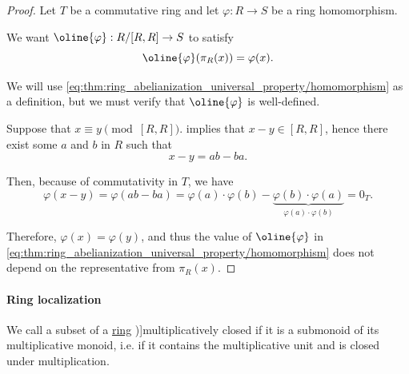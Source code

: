 \begin{proof}
  Let \( T \) be a commutative ring and let \( \varphi: R \to S \) be a ring homomorphism.

  We want \( \oline{\varphi}: R / [R, R] \to S \) to satisfy
  \begin{equation}\label{eq:thm:ring_abelianization_universal_property/homomorphism}
    \oline{\varphi}(\pi_R(x)) = \varphi(x).
  \end{equation}

  We will use \eqref{eq:thm:ring_abelianization_universal_property/homomorphism} as a definition, but we must verify that \( \oline{\varphi} \) is well-defined.

  Suppose that \( x \equiv y \pmod {[R, R]} \).  implies that \( x - y \in [R, R] \), hence there exist some \( a \) and \( b \) in \( R \) such that
  \begin{equation*}
    x - y = ab - ba.
  \end{equation*}

  Then, because of commutativity in \( T \), we have
  \begin{equation*}
    \varphi(x - y)
    =
    \varphi(ab - ba)
    =
    \varphi(a) \cdot \varphi(b) - \underbrace{\varphi(b) \cdot \varphi(a)}_{\varphi(a) \cdot \varphi(b)}
    =
    0_T.
  \end{equation*}

  Therefore, \( \varphi(x) = \varphi(y) \), and thus the value of \( \oline{\varphi} \) in \eqref{eq:thm:ring_abelianization_universal_property/homomorphism} does not depend on the representative from \( \pi_R(x) \).
\end{proof}

\paragraph{Ring localization}

\begin{definition}\label{def:multiplicatively_closed_ring_subset}
  We call a subset of a \hyperref[def:ring]{ring} \term[bg=мултипликативно затворено множество (\cite[23]{КоцевСидеров2016КомутативнаАлгебра})]{multiplicatively closed} if it is a submonoid of its multiplicative monoid, i.e. if it contains the multiplicative unit and is closed under multiplication.
\end{definition}

